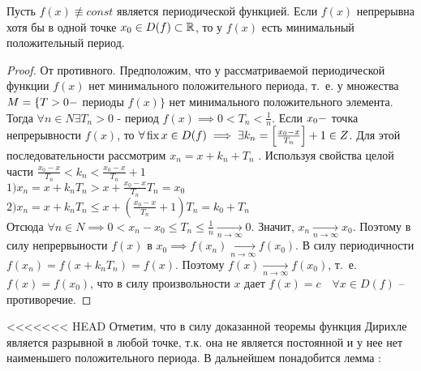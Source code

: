 \documentclass[../../main.tex]{subfiles}
\begin{document}
\begin{thm}
	Пусть $f(x) \not \equiv const$ является периодической функцией. Если $f(x)$
	 непрерывна хотя бы в одной точке $x_0 \in D(f) \subset \mathbb{R}$, то у $f(x)$ есть
	  минимальный положительный период.
	  \end{thm}
	\begin{proof}
	От противного. Предположим, что у рассматриваемой периодической функции
	 $f(x)$ нет минимального положительного периода, т.~е. у множества $M =
	  \{T > 0 \--$ периоды $f(x) \}$ нет минимального положительного элемента.
	   Тогда $\forall n \in N 
	\exists T_n > 0$ \-- период $f(x) \implies 0 < T_n < \frac{1}{n}$. Если $x_0 
	\--
	 $ точка непрерывности $f(x)$, то $\forall \operatorname{fix} x \in D(f) \implies \exists 
	 k_n =
	  \left[\frac{x_0 - x}{T_n}\right] + 1 \in Z$. Для этой последовательности
	   рассмотрим  $x_n = x + k_n + T_n$ . Используя свойства целой части 
	   $\frac{x_0 -
	   	 x}{T_n} < k_n < \frac{x_0 - x}{T_n} + 1$\\
	$1) x_n = x + k_nT_n > x + \frac{x_0 - x}{T_n}T_n = x_0$\\
	$2)x_n = x + k_nT_n \leq x+ \left( \frac{x_0 - x}{T_n} + 1 \right)T_n = k_0 + 
	T_n$\\
	Отсюда $\forall n \in N \implies 0 < x_n - x_0 \leq T_n \leq \frac{1}{n}
	 \xrightarrow[n \to \infty]{} 0$. Значит, $x_n \xrightarrow[n \to \infty]{} 
	 x_0$.
	  Поэтому в силу непрервыности $f(x)$ в $x_0 \implies f(x_n) \xrightarrow[n 
	  \to
	   \infty]{} f(x_0)$. В силу периодичности $f(x_n) = f(x + k_nT_n) = f(x)$. 
	   Поэтому
	    $f(x) \xrightarrow[n \to \infty]{} f(x_0)$, т.~е. $f(x) = f(x_0)$, что в 
	    силу
	     произвольности $x$  дает $f(x) = c\quad \forall x \in D(f)$ \--- 
	     противоречие.
	\end{proof}
<<<<<<< HEAD
	Отметим, что в силу доказанной теоремы функция Дирихле является разрывной в любой
	 точке, т.к. она не является постоянной и у нее нет наименьшего положительного
	  периода. В дальнейшем понадобится лемма :
\end{document}
